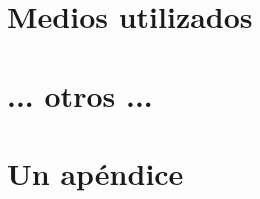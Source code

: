 \documentclass[a4paper,
	11pt,
	parskip=full,
	bibliography=totoc,
	twoside
	]{scrartcl}
\let\oldsection\section
\def\section{\cleardoubleoddpage\oldsection}
\renewcommand{\sectionmark}[1]{\markright{\thesection.\ #1}}
\begin{document}
\section{Medios utilizados}

\section{ ... otros ...}

\cleardoubleoddpage
	\renewcommand{\sectionmark}[1]{}
\begin{thebibliography}{9}
	\raggedright
	
\end{thebibliography}
\markright{\appendixname}

\cleardoubleoddpage
\appendix
{}

\section{Un apéndice}
	\FloatBarrier
\end{document}
